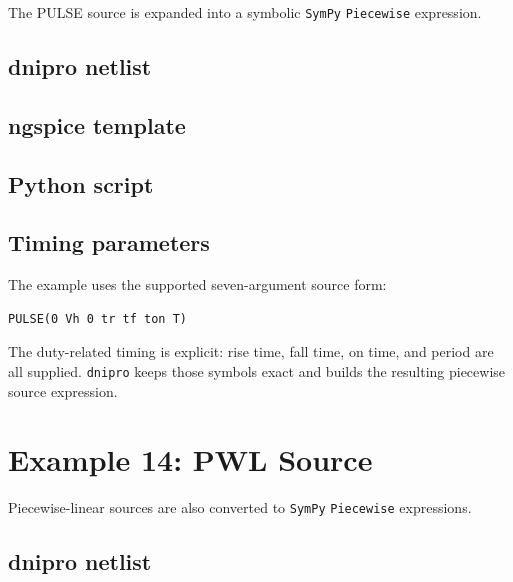 \documentclass[11pt,a4paper]{article}
\newcommand{\project}{\texttt{dnipro}}
\newcommand{\code}[1]{\texttt{#1}}
\newcommand{\sympy}{\texttt{SymPy}}
\begin{document}
The PULSE source is expanded into a symbolic \sympy{} \code{Piecewise}
expression.

\subsection{dnipro netlist}



\subsection{ngspice template}



\subsection{Python script}



\subsection{Timing parameters}

The example uses the supported seven-argument source form:

\begin{lstlisting}[style=spice]
PULSE(0 Vh 0 tr tf ton T)
\end{lstlisting}

The duty-related timing is explicit: rise time, fall time, on time, and period
are all supplied. \project{} keeps those symbols exact and builds the resulting
piecewise source expression.

\section{Example 14: PWL Source}
\label{sec:ex-pwl}

Piecewise-linear sources are also converted to \sympy{} \code{Piecewise}
expressions.

\subsection{dnipro netlist}


\end{document}
